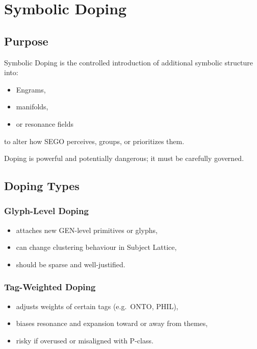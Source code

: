\chapter{Symbolic Doping}
\label{chap:Symbolic_Doping}

\section{Purpose}

Symbolic Doping is the controlled introduction of additional symbolic
structure into:
\begin{itemize}
    \item Engrams,
    \item manifolds,
    \item or resonance fields
\end{itemize}
to alter how SEGO perceives, groups, or prioritizes them.

Doping is powerful and potentially dangerous; it must be carefully
governed.

\section{Doping Types}

\subsection{Glyph-Level Doping}

\begin{itemize}
    \item attaches new GEN-level primitives or glyphs,
    \item can change clustering behaviour in Subject Lattice,
    \item should be sparse and well-justified.
\end{itemize}

\subsection{Tag-Weighted Doping}

\begin{itemize}
    \item adjusts weights of certain tags (e.g.\ ONTO, PHIL),
    \item biases resonance and expansion toward or away from themes,
    \item risky if overused or misaligned with P-class.
\end{itemize}


